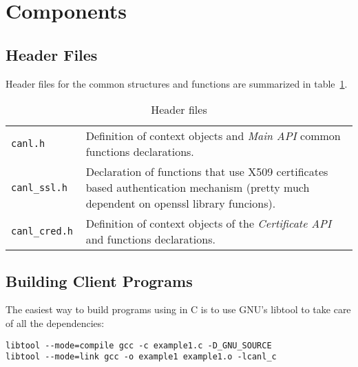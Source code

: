 \section{\CANL Components}
\label{s:common}

\subsection{Header Files}

Header files for the common structures and functions are summarized in
table~\ref{t:cheaders}.

\begin{table}[h]
\begin{tabularx}{\textwidth}{>{\tt}lX}
canl.h & Definition of context objects and \textit{Main API} common 
functions declarations. \\
canl\_ssl.h & Declaration of functions that use X509 certificates 
based authentication mechanism (pretty much dependent on 
openssl library funcions).\\
canl\_cred.h & Definition of context objects of the 
\textit{Certificate API}  and  functions declarations.\\
\end{tabularx}
\caption{Header files}
\label{t:cheaders}
\end{table}

\subsection{Building Client Programs}
The easiest way to build programs using \CANL in C is to use
GNU's libtool to take care of all the dependencies:
\begin{verbatim}
libtool --mode=compile gcc -c example1.c -D_GNU_SOURCE
libtool --mode=link gcc -o example1 example1.o -lcanl_c
\end{verbatim}

